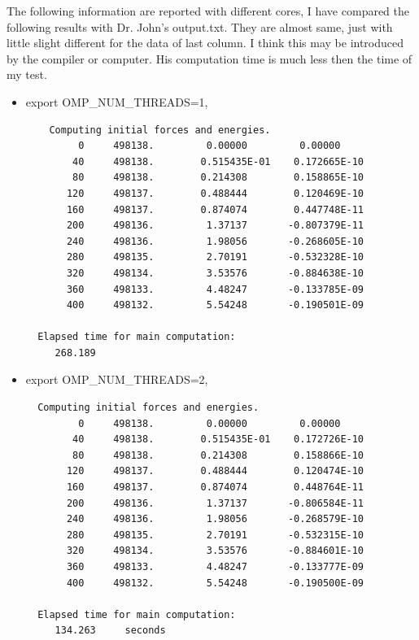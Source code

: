 \documentclass{article}
\begin{document}
The following information are reported with different cores, I have compared the following results with Dr. John's  output.txt.
They are almost same, just with little slight different for the data of last column.  I think this may be introduced
by the compiler or computer. His computation time is much less then the time of my test.
\begin{center}
\begin{itemize}
  \item export OMP\_NUM\_THREADS=1,
  {\tiny{\begin{verbatim}
    Computing initial forces and energies.
         0     498138.         0.00000         0.00000
        40     498138.        0.515435E-01    0.172665E-10
        80     498138.        0.214308        0.158865E-10
       120     498137.        0.488444        0.120469E-10
       160     498137.        0.874074        0.447748E-11
       200     498136.         1.37137       -0.807379E-11
       240     498136.         1.98056       -0.268605E-10
       280     498135.         2.70191       -0.532328E-10
       320     498134.         3.53576       -0.884638E-10
       360     498133.         4.48247       -0.133785E-09
       400     498132.         5.54248       -0.190501E-09

  Elapsed time for main computation:
     268.189
   \end{verbatim}   }}

     \item export OMP\_NUM\_THREADS=2,
    {\tiny{\begin{verbatim}
  Computing initial forces and energies.
         0     498138.         0.00000         0.00000
        40     498138.        0.515435E-01    0.172726E-10
        80     498138.        0.214308        0.158866E-10
       120     498137.        0.488444        0.120474E-10
       160     498137.        0.874074        0.448764E-11
       200     498136.         1.37137       -0.806584E-11
       240     498136.         1.98056       -0.268579E-10
       280     498135.         2.70191       -0.532315E-10
       320     498134.         3.53576       -0.884601E-10
       360     498133.         4.48247       -0.133777E-09
       400     498132.         5.54248       -0.190500E-09

  Elapsed time for main computation:
     134.263     seconds
   \end{verbatim} }}



\end{itemize}
\end{center}
\end{document}
